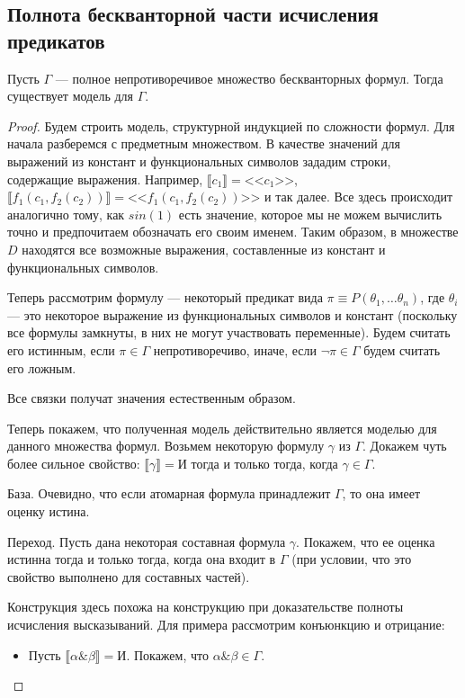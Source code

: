 \subsection{Полнота бескванторной части исчисления предикатов}

\begin{lemma}\label{full_quantor_less}
Пусть $\Gamma$ --- полное непротиворечивое множество бескванторных
формул. Тогда существует модель для $\Gamma$.
\end{lemma}

\begin{proof}
Будем строить модель, структурной индукцией по сложности формул.
Для начала разберемся с предметным множеством.
В качестве значений для выражений из констант и функциональных 
символов зададим строки, содержащие выражения. Например,
$\llbracket c_1 \rrbracket = \texttt{<<} c_1 \texttt{>>}$,
$\llbracket f_1 (c_1, f_2(c_2)) \rrbracket = \texttt{<<} f_1 (c_1, f_2(c_2)) \texttt{>>}$
и так далее. 
Все здесь происходит аналогично тому, как $sin(1)$
есть значение, которое мы не можем вычислить точно и предпочитаем
обозначать его своим именем.
Таким образом, в множестве $D$ находятся все возможные выражения,
составленные из констант и функциональных символов.

Теперь рассмотрим формулу --- некоторый предикат вида 
$\pi \equiv P(\theta_1, \dots \theta_n)$, 
где $\theta_i$ --- это некоторое выражение из 
функциональных символов и констант (поскольку все формулы замкнуты, 
в них не могут участвовать переменные). Будем считать его истинным,
если $\pi \in \Gamma$ непротиворечиво,
иначе, если $\neg\pi \in \Gamma$ будем считать его ложным.

Все связки получат значения естественным образом.

Теперь покажем, что полученная модель действительно является моделью
для данного множества формул. Возьмем некоторую формулу $\gamma$ из
$\Gamma$. Докажем чуть более сильное свойство: 
$\llbracket \gamma \rrbracket = \texttt{И}$ тогда и только тогда, 
когда $\gamma \in \Gamma$.

База. Очевидно, что если атомарная формула принадлежит $\Gamma$, то
она имеет оценку истина.

Переход. Пусть дана некоторая составная формула $\gamma$.
Покажем, что ее оценка истинна тогда и только тогда, когда она входит в $\Gamma$
(при условии, что это свойство выполнено для составных частей).

Конструкция здесь похожа на конструкцию при доказательстве полноты
исчисления высказываний. Для примера рассмотрим конъюнкцию и отрицание:
\begin{itemize}
\item Пусть $\llbracket \alpha \& \beta \rrbracket = \texttt{И}$.
Покажем, что $\alpha \& \beta \in \Gamma$. 


\end{itemize}
\end{proof}
